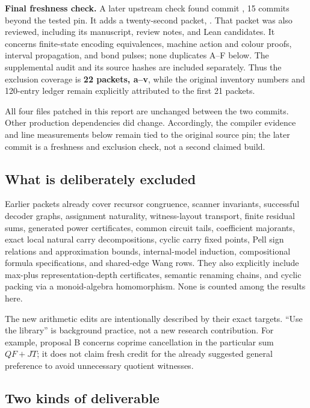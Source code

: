 \documentclass[11pt,a4paper]{article}
\newcommand{\code}[1]{\texttt{\detokenize{#1}}}
\begin{document}
\textbf{Final freshness check.} A later upstream check found commit
, 15 commits beyond the tested pin.
It adds a twenty-second packet, \code{2026-10-26v}. That packet was also reviewed,
including its manuscript, review notes, and Lean candidates. It concerns finite-state
encoding equivalences, machine action and colour proofs, interval propagation, and
bond pulses; none duplicates A--F below. The supplemental audit and its source
hashes are included separately. Thus the exclusion coverage is \textbf{22 packets,
a--v}, while the original inventory numbers and 120-entry ledger remain explicitly
attributed to the first 21 packets.

All four files patched in this report are unchanged between the two commits.
Other production dependencies did change. Accordingly, the compiler evidence and
line measurements below remain tied to the original source pin; the later commit
is a freshness and exclusion check, not a second claimed build.


\subsection{What is deliberately excluded}

Earlier packets already cover recursor congruence, scanner invariants, successful decoder graphs, assignment naturality, witness-layout transport, finite residual sums, generated power certificates, common circuit tails, coefficient majorants, exact local natural carry decompositions, cyclic carry fixed points, Pell sign relations and approximation bounds, internal-model induction, compositional formula specifications, and shared-edge Wang rows. They also explicitly include max-plus representation-depth certificates, semantic renaming chains, and cyclic packing via a monoid-algebra homomorphism. None is counted among the results here.

The new arithmetic edits are intentionally described by their exact targets. ``Use the library'' is background practice, not a new research contribution. For example, proposal B concerns coprime cancellation in the particular sum \(QF+JT\); it does not claim fresh credit for the already suggested general preference to avoid unnecessary quotient witnesses.

\subsection{Two kinds of deliverable}
\end{document}
